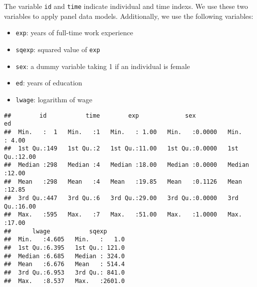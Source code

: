 \documentclass[
  12pt,
]{article}
\newenvironment{Shaded}{\begin{snugshade}}{\end{snugshade}}
\newcommand{\DecValTok}[1]{\textcolor[rgb]{0.00,0.00,0.81}{#1}}
\newcommand{\KeywordTok}[1]{\textcolor[rgb]{0.13,0.29,0.53}{\textbf{#1}}}
\newcommand{\NormalTok}[1]{#1}
\newcommand{\OperatorTok}[1]{\textcolor[rgb]{0.81,0.36,0.00}{\textbf{#1}}}
\newcommand{\StringTok}[1]{\textcolor[rgb]{0.31,0.60,0.02}{#1}}
\providecommand{\tightlist}{%
  \setlength{\itemsep}{0pt}\setlength{\parskip}{0pt}}
\begin{document}
The variable \texttt{id} and \texttt{time} indicate individual and time
indexs. We use these two variables to apply panel data models.
Additionally, we use the following variables:

\begin{itemize}
\tightlist
\item
  \texttt{exp}: years of full-time work experience
\item
  \texttt{sqexp}: squared value of \texttt{exp}
\item
  \texttt{sex}: a dummy variable taking 1 if an individual is female
\item
  \texttt{ed}: years of education
\item
  \texttt{lwage}: logarithm of wage
\end{itemize}

\begin{Shaded}
\end{Shaded}

\begin{verbatim}
##        id           time        exp             sex               ed       
##  Min.   :  1   Min.   :1   Min.   : 1.00   Min.   :0.0000   Min.   : 4.00  
##  1st Qu.:149   1st Qu.:2   1st Qu.:11.00   1st Qu.:0.0000   1st Qu.:12.00  
##  Median :298   Median :4   Median :18.00   Median :0.0000   Median :12.00  
##  Mean   :298   Mean   :4   Mean   :19.85   Mean   :0.1126   Mean   :12.85  
##  3rd Qu.:447   3rd Qu.:6   3rd Qu.:29.00   3rd Qu.:0.0000   3rd Qu.:16.00  
##  Max.   :595   Max.   :7   Max.   :51.00   Max.   :1.0000   Max.   :17.00  
##      lwage           sqexp       
##  Min.   :4.605   Min.   :   1.0  
##  1st Qu.:6.395   1st Qu.: 121.0  
##  Median :6.685   Median : 324.0  
##  Mean   :6.676   Mean   : 514.4  
##  3rd Qu.:6.953   3rd Qu.: 841.0  
##  Max.   :8.537   Max.   :2601.0
\end{verbatim}
\end{document}
